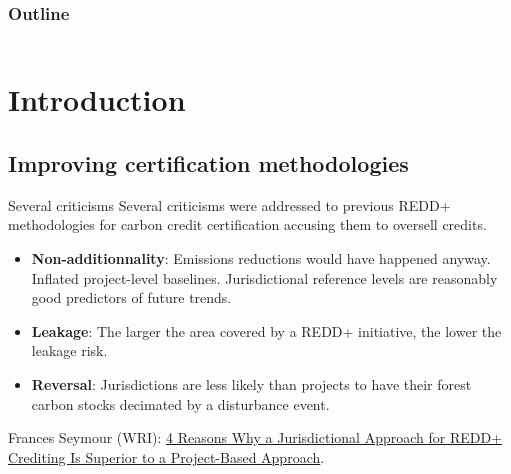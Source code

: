 \documentclass[10pt,table,dvipsnames,compress]{beamer}
\newif\ifplacelogo %
\begin{document}

\placelogotrue
\begin{frame}
  \frametitle{Outline}
  \begin{columns}[c]
    \begin{column}{0.5\textwidth}
      \tableofcontents[sections=1]
      \vspace{0.5cm}
      \tableofcontents[sections=2]
    \end{column}
    \begin{column}{0.5\textwidth}
        \tableofcontents[sections=3]
        \vspace{0.5cm}
        \tableofcontents[sections=4]
    \end{column}
  \end{columns}
\end{frame}
\placelogofalse

\section{Introduction}
\label{sec:orgf39e6bc}

\subsection{Improving certification methodologies}
\label{sec:org9dddddb}

\begin{frame}[label={sec:orge296f3b}]{Several criticisms}
Several criticisms were addressed to previous REDD+ methodologies for carbon credit certification accusing them to oversell credits.

\begin{itemize}
\item \textbf{Non-additionnality}: Emissions reductions would have happened anyway. Inflated project-level baselines. Jurisdictional reference levels are reasonably good predictors of future trends.
\item \textbf{Leakage}: The larger the area covered by a REDD+ initiative, the lower the leakage risk.
\item \textbf{Reversal}: Jurisdictions are less likely than projects to have their forest carbon stocks decimated by a disturbance event.
\end{itemize}

Frances Seymour (WRI): \href{https://www.wri.org/insights/insider-4-reasons-why-jurisdictional-approach-redd-crediting-superior-project-based}{4 Reasons Why a Jurisdictional Approach for REDD+ Crediting Is Superior to a Project-Based Approach}.
\end{frame}
\end{document}
